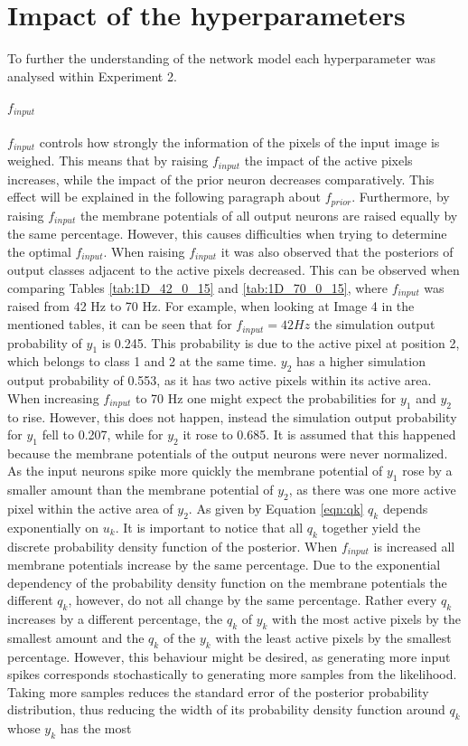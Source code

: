 \section{Impact of the hyperparameters}
\label{section:impactHyper}

To further the understanding of the network model each hyperparameter was analysed within Experiment 2.

\paragraph{$f_{input}$} $f_{input}$ controls how strongly the information of the pixels of the input image is weighed. This means that by raising $f_{input}$ the impact of the active pixels increases, while the impact of the prior neuron decreases comparatively. This effect will be explained in the following paragraph about $f_{prior}$. Furthermore, by raising $f_{input}$ the membrane potentials of all output neurons are raised equally by the same percentage. However, this causes difficulties when trying to determine the optimal $f_{input}$. When raising $f_{input}$ it was also observed that the posteriors of output classes adjacent to the active pixels decreased. This can be observed when comparing Tables \ref{tab:1D_42_0_15} and \ref{tab:1D_70_0_15}, where $f_{input}$ was raised from 42 Hz to 70 Hz. For example, when looking at Image 4 in the mentioned tables, it can be seen that for $f_{input} = 42 Hz$ the simulation output probability of $y_1$ is 0.245. This probability is due to the active pixel at position 2, which belongs to class 1 and 2 at the same time. $y_2$ has a higher simulation output probability of 0.553, as it has two active pixels within its active area. When increasing $f_{input}$ to 70 Hz one might expect the probabilities for $y_1$ and $y_2$ to rise. However, this does not happen, instead the simulation output probability for $y_1$ fell to 0.207, while for $y_2$ it rose to 0.685. It is assumed that this happened because the membrane potentials of the output neurons were never normalized. As the input neurons spike more quickly the membrane potential of $y_1$ rose by a smaller amount than the membrane potential of $y_2$, as there was one more active pixel within the active area of $y_2$. As given by Equation \ref{eqn:qk} $q_k$ depends exponentially on $u_k$. It is important to notice that all $q_k$ together yield the discrete probability density function of the posterior. When $f_{input}$ is increased all membrane potentials increase by the same percentage. Due to the exponential dependency of the probability density function on the membrane potentials the different $q_k$, however, do not all change by the same percentage. Rather every $q_k$ increases by a different percentage, the $q_k$ of $y_k$ with the most active pixels by the smallest amount and the $q_k$ of the $y_k$ with the least active pixels by the smallest percentage. However, this behaviour might be desired, as generating more input spikes corresponds stochastically to generating more samples from the likelihood. Taking more samples reduces the standard error of the posterior probability distribution, thus reducing the width of its probability density function around $q_k$ whose $y_k$ has the most 